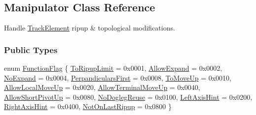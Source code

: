 \hypertarget{classKite_1_1Manipulator}{}\subsection{Manipulator Class Reference}
\label{classKite_1_1Manipulator}


Handle \mbox{\hyperlink{classKite_1_1TrackElement}{Track\+Element}} ripup \& topological modifications.  


\subsubsection*{Public Types}
\begin{DoxyCompactItemize}
\item 
enum \mbox{\hyperlink{classKite_1_1Manipulator_a2af2ad6b6441614038caf59d04b3b217}{Function\+Flag}} \{ \newline
\mbox{\hyperlink{classKite_1_1Manipulator_a2af2ad6b6441614038caf59d04b3b217a6c00c46010d69247a3edc18b70d700fa}{To\+Ripup\+Limit}} = 0x0001, 
\newline
\mbox{\hyperlink{classKite_1_1Manipulator_a2af2ad6b6441614038caf59d04b3b217a41880b9f6652400677e21c8681f97675}{Allow\+Expand}} = 0x0002, 
\newline
\mbox{\hyperlink{classKite_1_1Manipulator_a2af2ad6b6441614038caf59d04b3b217a6d972ea7eb37fa1b58a9b3b805241ffd}{No\+Expand}} = 0x0004, 
\newline
\mbox{\hyperlink{classKite_1_1Manipulator_a2af2ad6b6441614038caf59d04b3b217acdaeb48fa352f2898aa225b618ca26d4}{Perpandiculars\+First}} = 0x0008, 
\newline
\mbox{\hyperlink{classKite_1_1Manipulator_a2af2ad6b6441614038caf59d04b3b217a6d49b8eaa1014c8d0169a22b2f675b4d}{To\+Move\+Up}} = 0x0010, 
\newline
\mbox{\hyperlink{classKite_1_1Manipulator_a2af2ad6b6441614038caf59d04b3b217a195c742e60b541424ed7b231e9736803}{Allow\+Local\+Move\+Up}} = 0x0020, 
\newline
\mbox{\hyperlink{classKite_1_1Manipulator_a2af2ad6b6441614038caf59d04b3b217ad16eaf385267fc57b0deba7cf2c49244}{Allow\+Terminal\+Move\+Up}} = 0x0040, 
\newline
\mbox{\hyperlink{classKite_1_1Manipulator_a2af2ad6b6441614038caf59d04b3b217a03c3d2cc0e6cfcf5cb2022d70a07f510}{Allow\+Short\+Pivot\+Up}} = 0x0080, 
\newline
\mbox{\hyperlink{classKite_1_1Manipulator_a2af2ad6b6441614038caf59d04b3b217ab254c6d61bbff307a2eb6592e1546131}{No\+Dogleg\+Reuse}} = 0x0100, 
\newline
\mbox{\hyperlink{classKite_1_1Manipulator_a2af2ad6b6441614038caf59d04b3b217ab525fc8ee72323922f991c26e098bd5a}{Left\+Axis\+Hint}} = 0x0200, 
\newline
\mbox{\hyperlink{classKite_1_1Manipulator_a2af2ad6b6441614038caf59d04b3b217a4412082ce8109b740834fe21e7a671fb}{Right\+Axis\+Hint}} = 0x0400, 
\newline
\mbox{\hyperlink{classKite_1_1Manipulator_a2af2ad6b6441614038caf59d04b3b217aeea607aabb515b52c3b29df30b079d21}{Not\+On\+Last\+Ripup}} = 0x0800
 \}
\end{DoxyCompactItemize}
